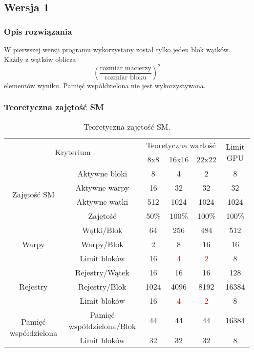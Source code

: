 
\subsection{Wersja 1}

\subsubsection{Opis rozwiązania}

W pierwszej wersji programu wykorzystany został tylko jeden blok wątków. Każdy z wątków oblicza $$ {\left(\frac{\text{rozmiar macierzy}}{\text{rozmiar bloku}}\right)}^{2} $$ elementów wyniku. Pamięć współdzielona nie jest wykorzystywana.



\subsubsection{Teoretyczna zajętość SM}

\begin{center}
\begin{table}[H]
\centering
\begin{tabular}{|c|c|c|c|c|c|}
\hline
\multicolumn{2}{|c|}{\multirow{2}{*}{Kryterium}} & \multicolumn{3}{c|}{Teoretyczna wartość} & \multirow{2}{*}{Limit GPU} \\ \cline{3-5}
\multicolumn{2}{|c|}{} & 8x8 & 16x16 & 22x22 & \\ \hline
\multirow{4}{*}{Zajętość SM} & Aktywne bloki & 8 & 4 & 2 & 8 \\ \cline{2-6}
& Aktywne warpy & 16 & 32 & 32 & 32 \\ \cline{2-6}
& Aktywne wątki & 512 & 1024 & 1024 & 1024 \\ \cline{2-6}
& Zajętość & 50\% & 100\% & 100\% & 100\% \\ \hline
\multirow{3}{*}{Warpy} & Wątki/Blok & 64 & 256 & 484 & 512 \\ \cline{2-6}
& Warpy/Blok & 2 & 8 & 16 & 16 \\ \cline{2-6}
& Limit bloków & 16 & \textcolor{red}{4} & \textcolor{red}{2} & 8 \\ \hline
\multirow{3}{*}{Rejestry} & Rejestry/Wątek & 16 & 16 & 16 & 128 \\ \cline{2-6}
& Rejestry/Blok & 1024 & 4096 & 8192 & 16384 \\ \cline{2-6}
& Limit bloków & 16 & \textcolor{red}{4} & \textcolor{red}{2} & 8 \\ \hline
\multirow{2}{*}{Pamięć współdzielona} & Pamięć współdzielona/Blok & 44 & 44 & 44 & 16384 \\ \cline{2-6}
& Limit bloków & 32 & 32 & 32 & 8 \\ \hline
\end{tabular}
\caption{Teoretyczna zajętość SM.}
\end{table}
\end{center}

